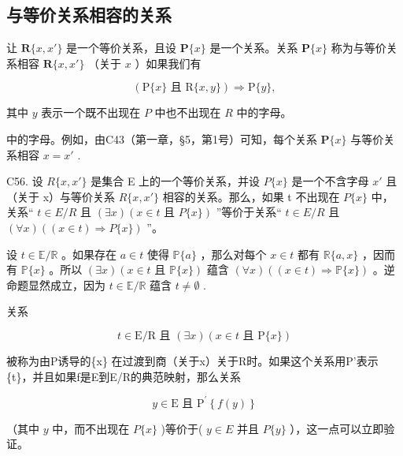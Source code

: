 \subsection{与等价关系相容的关系}

让 \(\mathbf{R}\{x, x'\}\) 是一个等价关系，且设 \(\mathbf{P}\{x\}\) 是一个关系。关系 \(\mathbf{P}\{x\}\) 称为与等价关系相容 \(\mathbf{R}\{x, x'\}\) （关于 \(x\) ）如果我们有

\[
(\mathrm{P} \{x \} \text {   且   } \mathrm{R} \{x, y \}) \Longrightarrow \mathrm{P} \{y \},
\]

其中 \(y\) 表示一个既不出现在 \(P\) 中也不出现在 \(R\) 中的字母。

中的字母。例如，由C43（第一章，§5，第1号）可知，每个关系 \(\mathbf{P}\{x\}\) 与等价关系相容 \(x = x'\) .

C56. 设 \(R\{x, x'\}\) 是集合 E 上的一个等价关系，并设 \(P\{x\}\) 是一个不含字母 \(x'\) 且（关于 x）与等价关系 \(R\{x, x'\}\) 相容的关系。那么，如果 t 不出现在 \(P\{x\}\) 中，关系“ \(t \in E/R\) 且 \((\exists x)(x \in t \text{ 且 } P\{x\})\) ”等价于关系“ \(t \in E/R\) 且 \((\forall x)((x \in t) \Longrightarrow P\{x\})\) ”。

设 \(t \in \mathbb{E} / \mathbb{R}\) 。如果存在 \(a \in t\) 使得 \(\mathbb{P}\{a\}\) ，那么对每个 \(x \in t\) 都有 \(\mathbb{R}\{a, x\}\) ，因而有 \(\mathbb{P}\{x\}\) 。所以 \((\exists x)(x \in t \text{ 且 } \mathbb{P}\{x\})\) 蕴含 \((\forall x)((x \in t) \Longrightarrow \mathbb{P}\{x\})\) 。逆命题显然成立，因为 \(t \in \mathbb{E} / \mathbb{R}\) 蕴含 \(t \neq \emptyset\) .

关系

\[
t \in \mathrm{E} / \mathrm{R} \text { 且 } (\exists x) (x \in t \text { 且 } \mathrm{P} \{x \})
\]

被称为由P诱导的\{x\} 在过渡到商（关于x）关于R时。如果这个关系用P'表示 \{t\}，并且如果f是E到E/R的典范映射，那么关系

\[
y \in \mathrm{E} \text {   且   } \mathrm{P} ^ {\prime} \left\{f (y) \right\}
\]

（其中 \(y\) 中，而不出现在 \(P\{x\}\) )等价于( \(y \in E\) 并且 \(P\{y\}\) ），这一点可以立即验证。

